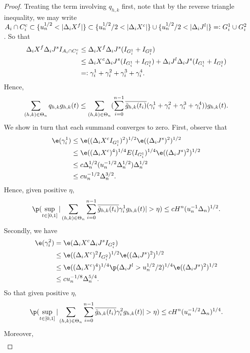 \begin{proof}
Treating the term involving $q_{h,k}$ first, note that by the reverse triangle inequality, we may  write $A_i \cap C_i^c \subset \{ u_n^{1/2} < \vert \Delta_i X^f \vert  \} \subset \{ u_n^{1/2}/2 < \vert \Delta_i X^c \vert  \} \cup  \{ u_n^{1/2}/2 < \vert \Delta_i J^l \vert  \} =: G^1_i \cup G^2_i\notag$. So that 
\begin{align}
  \Delta_i X^f \Delta_i J^s I_{A_i \cap C_i^c} &\le \Delta_i X^f \Delta_i J^s  (I_{G^1_i} +  I_{G^2_i}) \notag\\
  & \le \Delta_i X^c \Delta_i J^s(I_{G^1_i} +  I_{G^2_i}) + \Delta_i J^l \Delta_i J^s(I_{G^1_i} +  I_{G^2_i}) \notag \\
  & =: \gamma_i^1 + \gamma_i^2 + \gamma_i^3 + \gamma^4_i.\notag 
\end{align}
Hence, \begin{align} \notag \sum_{(h,k) \in \Theta_n} q_{h,k} g_{h,k}(t) \le \sum_{(h,k) \in \Theta_n} (\sum_{i = 0}^{n-1} \overline{\tilde{g}_{h,k}(t_i)} (\gamma_i^1 + \gamma_i^2 + \gamma_i^3 + \gamma^4_i)) g_{h,k}(t). \end{align} We show in turn that each summand converges to zero. First, observe that
\begin{align}
  \e(\gamma_i^1) &\le  \e( (\dxc  I_{G^1_i})^2)^{1/2} \e( (\djt)^2)^{1/2} \notag\\
  &\le  \e( (\dxc)^4)^{1/4}  E(I_{G^1_i})^{1/4} \e( (\djt)^2)^{1/2} \notag\\
  & \le c \Delta_n^{1/2} (u^{-1/2}_n \Delta_n^{1/2}) \Delta_n^{1/2} \notag \\
  & \le c u^{-1/2}_n \Delta_n^{3/2}.
  \label{}
\end{align}
Hence, given positive $\eta$, 
\begin{align} 
  \p( \sup_{t \in \domain}\vert \sumt \sumin \btghki \gamma^1_i \ghk(t)\vert > \eta) \le cH^n (u^{-1}_n\Delta_n)^{1/2}. \label{eq:g1} \end{align}
Secondly, we have 
\begin{align}
  \e(\gamma_i^2) & =  \e(\dxc \djt I_{G^2_i}) \notag\\
  & \le \e((\dxc)^2 I_{G^2_i})^{1/2} \e((\djt)^2)^{1/2}\notag \\
  &\le \e((\dxc)^4)^{1/4} \p(\djl > u_n^{1/2}/2)^{1/4} \e((\djt)^2)^{1/2}\notag\\
  & \le  c u^{-1/8}_n \Delta_n^{5/4}. \notag
\end{align}
So that given positive $\eta$,
\begin{align} 
  \label{eq:g2}
  \p( \sup_{t \in \domain}\vert \sumt \sumin \btghki \gamma^2_i \ghk(t)\vert > \eta) \le cH^n (u^{-1/2}_n\Delta_n)^{1/4}.  \end{align}
Moreover, 
\begin{align}

\end{align}
\end{proof}
